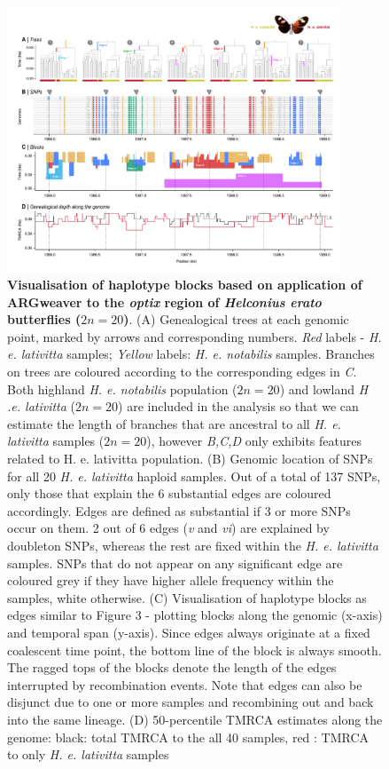 \documentclass[twocolumn]{bmcart}%
\begin{document}
\begin{figure}
    \includegraphics[width=0.89\textwidth]{Fig_5.pdf}
    \caption{\footnotesize{\textbf{Visualisation of haplotype blocks based on
application of ARGweaver to the \emph{optix} region of \emph{Helconius
erato} butterflies ($2n = 20$)}. (A) Genealogical trees at each
genomic point, marked by arrows and corresponding numbers. \emph{Red}
labels - \emph{H. e. lativitta} samples; \emph{Yellow} labels: \emph{H.
e. notabilis} samples. Branches on trees are coloured according to the
corresponding edges in \emph{C}. Both highland \emph{H. e. notabilis}
population ($2n = 20$) and lowland \emph{H .e. lativitta} ($2n = 20$)
are included in the analysis so that we can estimate the length of
branches that are ancestral to all \emph{H. e. lativitta} samples
($2n = 20$), however \emph{B,C,D} only exhibits features related to
H. e. lativitta population. (B) Genomic location of SNPs for all 20
\emph{H. e. lativitta} haploid samples. Out of a total of 137 SNPs, only
those that explain the 6 substantial edges are coloured accordingly.
Edges are defined as substantial if 3 or more SNPs occur on them. 2 out
of 6 edges (\emph{v} and \emph{vi}) are explained by doubleton SNPs,
whereas the rest are fixed within the \emph{H. e. lativitta} samples.
SNPs that do not appear on any significant edge are coloured grey if
they have higher allele frequency within the samples, white otherwise.
(C) Visualisation of haplotype blocks as edges similar to Figure 3 -
plotting blocks along the genomic (x-axis) and temporal span
(y-axis). Since edges always originate at a fixed coalescent time
point, the bottom line of the block is always smooth. The ragged tops of
the blocks denote the length of the edges interrupted by recombination
events. Note that edges can also be disjunct due to one or more samples
and recombining out and back into the same lineage. (D) 50-percentile
TMRCA estimates along the genome: black: total TMRCA to the all 40
samples, red : TMRCA to only \emph{H. e. lativitta} samples} }
\end{figure}
\end{document}
